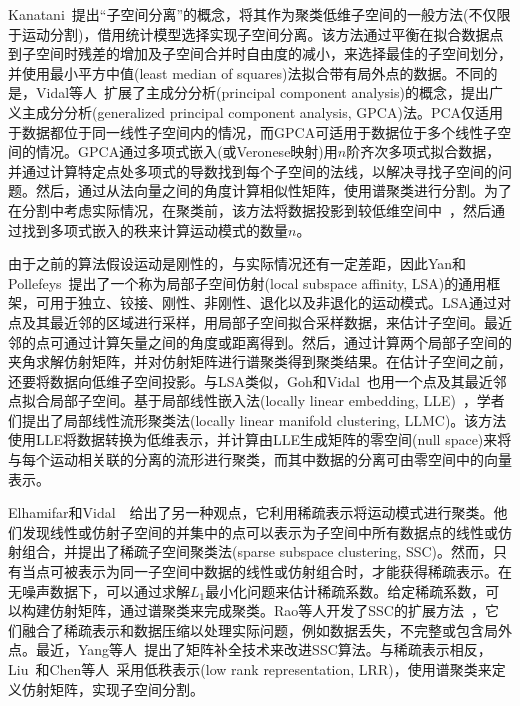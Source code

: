 Kanatani~\cite{kanatani2001motionA}提出“子空间分离”的概念，将其作为聚类低维子空间的一般方法(不仅限于运动分割)，借用统计模型选择实现子空间分离。该方法通过平衡在拟合数据点到子空间时残差的增加及子空间合并时自由度的减小，来选择最佳的子空间划分，并使用最小平方中值(least median of squares)法拟合带有局外点的数据。不同的是，Vidal等人~\cite{vidal2005generalized}扩展了主成分分析(principal component analysis)的概念，提出广义主成分分析(generalized principal component analysis, GPCA)法。PCA仅适用于数据都位于同一线性子空间内的情况，而GPCA可适用于数据位于多个线性子空间的情况。GPCA通过多项式嵌入(或Veronese映射)用$n$阶齐次多项式拟合数据，并通过计算特定点处多项式的导数找到每个子空间的法线，以解决寻找子空间的问题。然后，通过从法向量之间的角度计算相似性矩阵，使用谱聚类进行分割。为了在分割中考虑实际情况，在聚类前，该方法将数据投影到较低维空间中~\cite{vidal2005generalized}，然后通过找到多项式嵌入的秩来计算运动模式的数量$n$。

由于之前的算法假设运动是刚性的，与实际情况还有一定差距，因此Yan和Pollefeys~\cite{yan2006general}提出了一个称为局部子空间仿射(local subspace affinity, LSA)的通用框架，可用于独立、铰接、刚性、非刚性、退化以及非退化的运动模式。LSA通过对点及其最近邻的区域进行采样，用局部子空间拟合采样数据，来估计子空间。最近邻的点可通过计算矢量之间的角度或距离得到。然后，通过计算两个局部子空间的夹角求解仿射矩阵，并对仿射矩阵进行谱聚类得到聚类结果。在估计子空间之前，还要将数据向低维子空间投影。与LSA类似，Goh和Vidal~\cite{goh2007segmenting}也用一个点及其最近邻点拟合局部子空间。基于局部线性嵌入法(locally linear embedding, LLE)~\cite{saul2003think}，学者们提出了局部线性流形聚类法(locally linear manifold clustering, LLMC)。该方法使用LLE将数据转换为低维表示，并计算由LLE生成矩阵的零空间(null space)来将与每个运动相关联的分离的流形进行聚类，而其中数据的分离可由零空间中的向量表示。

Elhamifar和Vidal~\cite{elhamifar2009sparse}~\cite{elhamifar2013sparse}给出了另一种观点，它利用稀疏表示将运动模式进行聚类。他们发现线性或仿射子空间的并集中的点可以表示为子空间中所有数据点的线性或仿射组合，并提出了稀疏子空间聚类法(sparse subspace clustering, SSC)。然而，只有当点可被表示为同一子空间中数据的线性或仿射组合时，才能获得稀疏表示。在无噪声数据下，可以通过求解$L_1$最小化问题来估计稀疏系数。给定稀疏系数，可以构建仿射矩阵，通过谱聚类来完成聚类。Rao等人开发了SSC的扩展方法~\cite{rao2009motion}，它们融合了稀疏表示和数据压缩以处理实际问题，例如数据丢失，不完整或包含局外点。最近，Yang等人~\cite{yang2015sparse}提出了矩阵补全技术来改进SSC算法。与稀疏表示相反，Liu~\cite{liu2012robust}和Chen等人~\cite{liu2010robust}采用低秩表示(low rank representation, LRR)，使用谱聚类来定义仿射矩阵，实现子空间分割。

